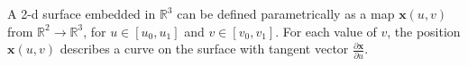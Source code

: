 \begin{definition}[2D Surface]
  A 2-d surface embedded in $\mathbb{R}^3$ can be defined parametrically as a map $\boldsymbol{x}(u, v)$ from $\mathbb{R}^2 \rightarrow \mathbb{R}^3$, for $u \in\left[u_0, u_1\right]$ and $v \in\left[v_0, v_1\right]$. For each value of $v$, the position $\boldsymbol{x}(u, v)$ describes a curve on the surface with tangent vector $\frac{\partial \boldsymbol{x}}{\partial u}$.
\end{definition}


